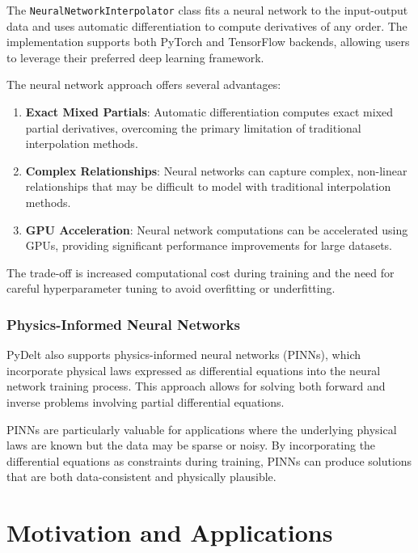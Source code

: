 \documentclass[11pt,a4paper]{article}
\begin{document}
The \texttt{NeuralNetworkInterpolator} class fits a neural network to the input-output data and uses automatic differentiation to compute derivatives of any order. The implementation supports both PyTorch and TensorFlow backends, allowing users to leverage their preferred deep learning framework.

The neural network approach offers several advantages:

\begin{enumerate}
    \item \textbf{Exact Mixed Partials}: Automatic differentiation computes exact mixed partial derivatives, overcoming the primary limitation of traditional interpolation methods.
    
    \item \textbf{Complex Relationships}: Neural networks can capture complex, non-linear relationships that may be difficult to model with traditional interpolation methods.
    
    \item \textbf{GPU Acceleration}: Neural network computations can be accelerated using GPUs, providing significant performance improvements for large datasets.
\end{enumerate}

The trade-off is increased computational cost during training and the need for careful hyperparameter tuning to avoid overfitting or underfitting.

\subsubsection{Physics-Informed Neural Networks}

PyDelt also supports physics-informed neural networks (PINNs), which incorporate physical laws expressed as differential equations into the neural network training process. This approach allows for solving both forward and inverse problems involving partial differential equations.

PINNs are particularly valuable for applications where the underlying physical laws are known but the data may be sparse or noisy. By incorporating the differential equations as constraints during training, PINNs can produce solutions that are both data-consistent and physically plausible.

\section{Motivation and Applications}
\end{document}
